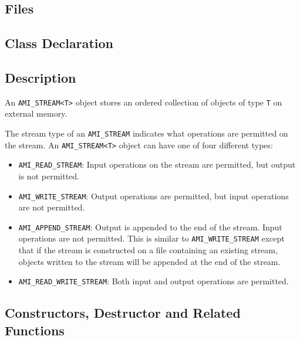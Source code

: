 \subsection{Files}
  \btabb
     {}
  \etabb

\subsection{Class Declaration}
  \btabb
     {}
  \etabb

\subsection{Description}
An \lstinline|AMI_STREAM<T>| object stores an ordered collection of objects of
type \lstinline|T| on external memory.

The stream type of an \lstinline|AMI_STREAM| indicates what
operations are permitted on the stream.
An \lstinline|AMI_STREAM<T>| object can have one of four different
types:
\begin{itemize}
    
    \item \lstinline|AMI_READ_STREAM|: Input operations on
    the stream are permitted, but output is not permitted.
    
    \item \lstinline|AMI_WRITE_STREAM|: Output operations are
    permitted, but input operations are not permitted. 
    
    \item \lstinline|AMI_APPEND_STREAM|: Output is appended
    to the end of the stream. Input operations are not
    permitted. This is similar to
    \lstinline|AMI_WRITE_STREAM| except that if the stream is
    constructed on a file containing an existing stream,
    objects written to the stream will be appended at the
    end of the stream.

    \item \lstinline|AMI_READ_WRITE_STREAM|: Both input and output
    operations are permitted.
\end{itemize}

\clearpage

\subsection{Constructors, Destructor and Related Functions}

